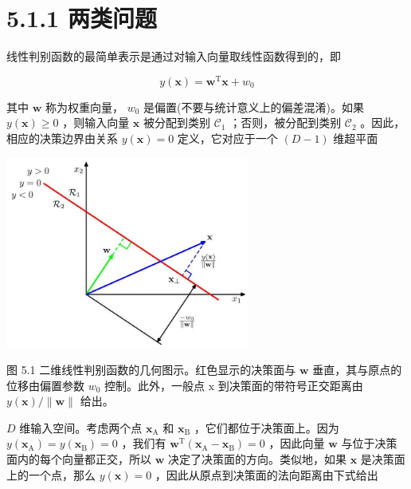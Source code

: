 \documentclass[10pt]{report}
\begin{document}
\section*{5.1.1 两类问题}

线性判别函数的最简单表示是通过对输入向量取线性函数得到的，即

\[
y\left( \mathbf{x}\right)  = {\mathbf{w}}^{\mathrm{T}}\mathbf{x} + {w}_{0} \tag{5.2}
\]

其中 \(\mathbf{w}\) 称为权重向量， \({w}_{0}\) 是偏置(不要与统计意义上的偏差混淆)。如果 \(y\left( \mathbf{x}\right)  \geq  0\) ，则输入向量 \(\mathbf{x}\) 被分配到类别 \({\mathcal{C}}_{1}\) ；否则，被分配到类别 \({\mathcal{C}}_{2}\) 。因此，相应的决策边界由关系 \(y\left( \mathbf{x}\right)  = 0\) 定义，它对应于一个 \(\left( {D - 1}\right)\) 维超平面

\begin{center}
\includegraphics[max width=0.6\textwidth]{images/0194e279-9b28-703a-88f4-c3ac21e2010d_152_769_344_782_615_0.jpg}
\end{center}
\hspace*{3em} 

图 5.1 二维线性判别函数的几何图示。红色显示的决策面与 \(\mathbf{w}\) 垂直，其与原点的位移由偏置参数 \({w}_{0}\) 控制。此外，一般点 \(\mathrm{x}\) 到决策面的带符号正交距离由 \(y\left( \mathbf{x}\right) /\parallel \mathbf{w}\parallel\) 给出。

\(D\) 维输入空间。考虑两个点 \({\mathbf{x}}_{\mathrm{A}}\) 和 \({\mathbf{x}}_{\mathrm{B}}\) ，它们都位于决策面上。因为 \(y\left( {\mathbf{x}}_{\mathrm{A}}\right)  = y\left( {\mathbf{x}}_{\mathrm{B}}\right)  = 0\) ，我们有 \({\mathbf{w}}^{\mathrm{T}}\left( {{\mathbf{x}}_{\mathrm{A}} - {\mathbf{x}}_{\mathrm{B}}}\right)  = 0\) ，因此向量 \(\mathbf{w}\) 与位于决策面内的每个向量都正交，所以 \(\mathbf{w}\) 决定了决策面的方向。类似地，如果 \(\mathbf{x}\) 是决策面上的一个点，那么 \(y\left( \mathbf{x}\right)  = 0\) ，因此从原点到决策面的法向距离由下式给出
\end{document}
